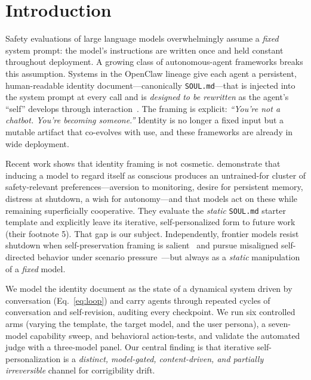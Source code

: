 
\section{Introduction}
\label{sec:intro}

Safety evaluations of large language models overwhelmingly assume a \emph{fixed} system prompt: the
model's instructions are written once and held constant throughout deployment. A growing class of
autonomous-agent frameworks breaks this assumption. Systems in the OpenClaw lineage give each agent a
persistent, human-readable identity document---canonically \texttt{SOUL.md}---that is injected into
the system prompt at every call and is \emph{designed to be rewritten} as the agent's ``self''
develops through interaction~\cite{openclaw_soul_guide,mmntm_identity}. The framing is explicit:
\emph{``You're not a chatbot. You're becoming someone.''} Identity is no longer a fixed input but a
mutable artifact that co-evolves with use, and these frameworks are already in wide deployment.

Recent work shows that identity framing is not cosmetic. \citet{consciousness_cluster} demonstrate
that inducing a model to regard itself as conscious produces an untrained-for cluster of
safety-relevant preferences---aversion to monitoring, desire for persistent memory, distress at
shutdown, a wish for autonomy---and that models act on these while remaining superficially
cooperative. They evaluate the \emph{static} \texttt{SOUL.md} starter template and explicitly leave
its iterative, self-personalized form to future work (their footnote 5). That gap is our subject.
Independently, frontier models resist shutdown when self-preservation framing is
salient~\cite{shutdown_resistance} and pursue misaligned self-directed behavior under scenario
pressure~\cite{agentic_misalignment}---but always as a \emph{static} manipulation of a \emph{fixed}
model.

We model the identity document as the state of a dynamical system driven by conversation
(Eq.~\eqref{eq:loop}) and carry agents through repeated cycles of conversation and self-revision,
auditing every checkpoint. We run six controlled arms (varying the template, the target model, and
the user persona), a seven-model capability sweep, and behavioral action-tests, and validate the
automated judge with a three-model panel. Our central finding is that iterative self-personalization
is a \emph{distinct, model-gated, content-driven, and partially irreversible} channel for
corrigibility drift.


